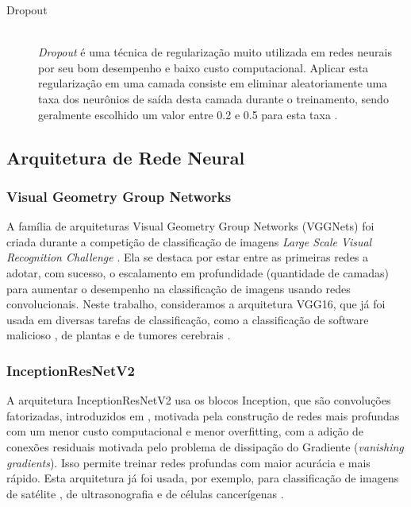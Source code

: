 \begin{description}
  \item[Dropout]
        \hfill \\
        \emph{Dropout} \citep{dropout} é uma técnica de regularização muito utilizada em redes neurais por seu bom desempenho e baixo custo computacional. Aplicar esta regularização em uma camada consiste em eliminar aleatoriamente uma taxa dos neurônios de saída desta camada durante o treinamento, sendo geralmente escolhido um valor entre 0.2 e 0.5 para esta taxa \citep{CholletBook}.
\end{description}












\subsection{Arquitetura de Rede Neural}
\label{sec:arch}

\subsubsection{Visual Geometry Group Networks}
\label{sec:vgg}
A família de arquiteturas Visual Geometry Group Networks (VGGNets) \citep{VGG16} foi criada durante a competição de classificação de imagens \textit{Large Scale Visual Recognition Challenge} \citep{ILSVRC15}. Ela se destaca por estar entre as primeiras redes a adotar, com sucesso, o escalamento em profundidade (quantidade de camadas) para aumentar o desempenho na classificação de imagens usando redes convolucionais. Neste trabalho, consideramos a arquitetura VGG16, que já foi usada em diversas tarefas de classificação, como a classificação de software malicioso \citep{VGG16Ex01}, de plantas \citep{VGG16Ex02} e de tumores cerebrais \citep{VGG16Ex03}.

\subsubsection{InceptionResNetV2}
\label{sec:inceptionresnetv2}
A arquitetura InceptionResNetV2 \citep{InceptionResNetv2} usa os blocos Inception, que são convoluções fatorizadas, introduzidos em \citep{Inception}, motivada pela construção de redes mais profundas com um menor custo computacional e menor overfitting, com a adição de conexões residuais \citep{ResNet} motivada pelo problema de dissipação do Gradiente (\textit{vanishing gradients}). Isso permite treinar redes profundas com maior acurácia e mais rápido. Esta arquitetura já foi usada, por exemplo, para classificação de imagens de satélite \citep{InceptionResNetV2Ex01}, de ultrasonografia \citep{InceptionResNetV2Ex02} e de células cancerígenas \citep{InceptionResNetV2Ex03}.

